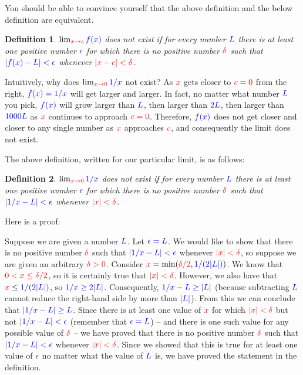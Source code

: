 \documentclass{myarticle}
\newcommand{\hor}[1]{\textcolor{red}{#1}} %
\newcommand{\ver}[1]{\textcolor{blue}{#1}}
\theoremstyle{nospace}
\newtheorem*{oldattempt}{Definition}
\newenvironment{attempt}{\begin{mdframed}\begin{oldattempt}}{\end{oldattempt}\end{mdframed}}
\newtheorem{old series theorem}{Theorem}
\newenvironment{series theorem}{\begin{mdframed}\begin{old series theorem}}{\end{old series theorem}\end{mdframed}}
\begin{document}
You should be able to convince yourself that the above definition and the below definition are equivalent.

\begin{attempt} $\lim_{\hor{x \to c}} \ver{f(x)}$ does not exist if for every number $\ver{L}$ there is at least one positive number $\ver{\epsilon}$ for which there is \emph{no} positive number $\hor{\delta}$ such that $\ver{|f(x) - L| < \epsilon}$ whenever $\hor{|x - c| < \delta}$. \end{attempt}

Intuitively, why does $\lim_{\hor{x \to 0}} \ver{1/x}$ not exist? As $\hor{x}$ gets closer to $\hor{c = 0}$ from the right, $\ver{f(x) = 1/x}$ will get larger and larger. In fact, no matter what number $\ver{L}$ you pick, $\ver{f(x)}$ will grow larger than $\ver{L}$, then larger than $\ver{2L}$, then larger than $\ver{1000L}$ as $\hor{x}$ continues to approach $\hor{c = 0}$. Therefore, $\ver{f(x)}$ does not get closer and closer to any single number as $\hor{x}$ approaches $\hor{c}$, and consequently the limit does not exist.

The above definition, written for our particular limit, is as follows:

\begin{attempt} $\lim_{\hor{x \to 0}} \ver{1/x}$ does not exist if for every number $\ver{L}$ there is at least one positive number $\ver{\epsilon}$ for which there is no positive number $\hor{\delta}$ such that $\ver{|1/x - L| < \epsilon}$ whenever $\hor{|x| < \delta}$. \end{attempt}

Here is a proof:

\begin{mdframed} Suppose we are given a number $\ver{L}$. Let $\ver{\epsilon = L}$. We would like to show that there is no positive number $\hor{\delta}$ such that $\ver{|1/x - L| < \epsilon}$ whenever $\hor{|x| < \delta}$, so suppose we are given an arbitrary $\hor{\delta > 0}$. Consider $\hor{x} = \min(\hor{\delta/2}, \ver{1/(2|L|)})$. We know that $\hor{0 < x \leq \delta/2}$, so it is certainly true that $\hor{|x| < \delta}$. However, we also have that $\hor{x} \leq \ver{1/(2|L|)}$, so $\ver{1/x \geq 2|L|}$. Consequently, $\ver{1/x - L \geq |L|}$ (because subtracting $\ver{L}$ cannot reduce the right-hand side by more than $\ver{|L|}$). From this we can conclude that $\ver{|1/x - L| \geq L}$. Since there is at least one value of $\hor{x}$ for which $\hor{|x| < \delta}$ but not $\ver{|1/x - L| < \epsilon}$ (remember that $\ver{\epsilon = L}$) -- and there is one such value for any possible value of $\hor{\delta}$ -- we have proved that there is no positive number $\hor{\delta}$ such that $\ver{|1/x - L| < \epsilon}$ whenever $\hor{|x| < \delta}$. Since we showed that this is true for at least one value of $\ver{\epsilon}$ no matter what the value of $\ver{L}$ is, we have proved the statement in the definition. \end{mdframed}
\end{document}

